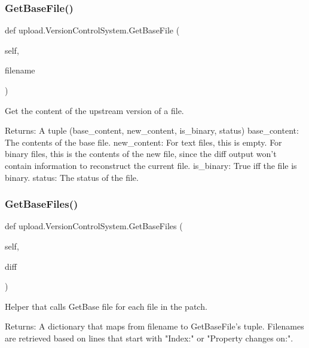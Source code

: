 \subsubsection{\texorpdfstring{Get\+Base\+File()}{GetBaseFile()}\hspace{0.1cm}{\footnotesize\ttfamily [2/2]}}
{\footnotesize\ttfamily def upload.\+Version\+Control\+System.\+Get\+Base\+File (\begin{DoxyParamCaption}\item[{}]{self,  }\item[{}]{filename }\end{DoxyParamCaption})}

\begin{DoxyVerb}Get the content of the upstream version of a file.

Returns:
  A tuple (base_content, new_content, is_binary, status)
base_content: The contents of the base file.
new_content: For text files, this is empty.  For binary files, this is
  the contents of the new file, since the diff output won't contain
  information to reconstruct the current file.
is_binary: True iff the file is binary.
status: The status of the file.
\end{DoxyVerb}
 \mbox{\label{classupload_1_1_version_control_system_a812c3b3daf90c88b015fa4b26252e291}} 
\subsubsection{\texorpdfstring{Get\+Base\+Files()}{GetBaseFiles()}\hspace{0.1cm}{\footnotesize\ttfamily [1/2]}}
{\footnotesize\ttfamily def upload.\+Version\+Control\+System.\+Get\+Base\+Files (\begin{DoxyParamCaption}\item[{}]{self,  }\item[{}]{diff }\end{DoxyParamCaption})}

\begin{DoxyVerb}Helper that calls GetBase file for each file in the patch.

Returns:
  A dictionary that maps from filename to GetBaseFile's tuple.  Filenames
  are retrieved based on lines that start with "Index:" or
  "Property changes on:".
\end{DoxyVerb}
 \mbox{\label{classupload_1_1_version_control_system_a812c3b3daf90c88b015fa4b26252e291}} 

